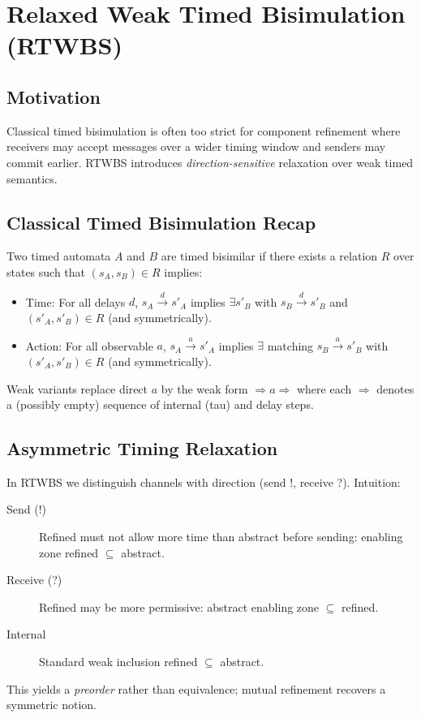 \section{Relaxed Weak Timed Bisimulation (RTWBS)}
\subsection{Motivation}
Classical timed bisimulation is often too strict for component refinement where receivers may accept messages over a wider timing window and senders may commit earlier. RTWBS introduces \emph{direction-sensitive} relaxation over weak timed semantics.

\subsection{Classical Timed Bisimulation Recap}
Two timed automata \(A\) and \(B\) are timed bisimilar if there exists a relation \(R\) over states such that \((s_A, s_B) \in R\) implies:
\begin{itemize}
  \item Time: For all delays \(d\), \(s_A \xrightarrow{d} s'_A\) implies \(\exists s'_B\) with \(s_B \xrightarrow{d} s'_B\) and \((s'_A, s'_B) \in R\) (and symmetrically).
  \item Action: For all observable \(a\), \(s_A \xrightarrow{a} s'_A\) implies \(\exists\) matching \(s_B \xrightarrow{a} s'_B\) with \((s'_A, s'_B) \in R\) (and symmetrically).
\end{itemize}
Weak variants replace direct \(a\) by the weak form \(\Rightarrow a \Rightarrow\) where each \(\Rightarrow\) denotes a (possibly empty) sequence of internal (tau) and delay steps.

\subsection{Asymmetric Timing Relaxation}
In RTWBS we distinguish channels with direction (send !, receive ?). Intuition:
\begin{description}
  \item[Send (!)] Refined must not allow more time than abstract before sending: enabling zone refined \(\subseteq\) abstract.
  \item[Receive (?)] Refined may be more permissive: abstract enabling zone \(\subseteq\) refined.
  \item[Internal] Standard weak inclusion refined \(\subseteq\) abstract.
\end{description}
This yields a \emph{preorder} rather than equivalence; mutual refinement recovers a symmetric notion.

